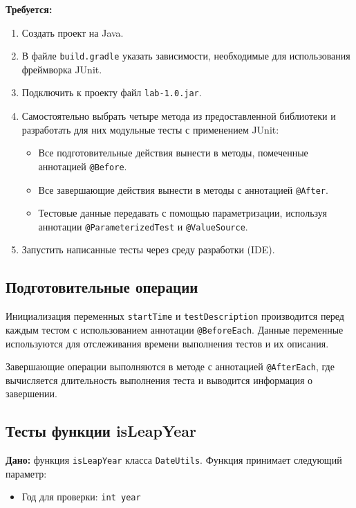 \documentclass{article}[14pt]
\begin{document}
\noindent \textbf{Требуется:}
\begin{enumerate}
\item Создать проект на Java.
\item В файле \texttt{build.gradle} указать зависимости, необходимые для использования фреймворка JUnit.
\item Подключить к проекту файл \texttt{lab-1.0.jar}.
\item Самостоятельно выбрать четыре метода из предоставленной библиотеки и разработать для них модульные тесты с применением JUnit:
  \begin{itemize}
    \item Все подготовительные действия вынести в методы, помеченные аннотацией \texttt{@Before}.
    \item Все завершающие действия вынести в методы с аннотацией \texttt{@After}.
    \item Тестовые данные передавать с помощью параметризации, используя аннотации \texttt{@ParameterizedTest} и \texttt{@ValueSource}.
  \end{itemize}
\item Запустить написанные тесты через среду разработки (IDE).
\end{enumerate}

\subsection{Подготовительные операции}

Инициализация переменных \texttt{startTime} и \texttt{testDescription} производится перед каждым тестом с использованием аннотации \texttt{@BeforeEach}. Данные переменные используются для отслеживания времени выполнения тестов и их описания.

Завершающие операции выполняются в методе с аннотацией \texttt{@AfterEach}, где вычисляется длительность выполнения теста и выводится информация о завершении.

\subsection{Тесты функции isLeapYear}

\textbf{Дано:} функция \texttt{isLeapYear} класса \texttt{DateUtils}. Функция принимает следующий параметр:
\begin{itemize}
    \item Год для проверки: \texttt{int year}
\end{itemize}
\end{document}
